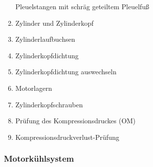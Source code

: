 \begin{enumerate}
  Pleuelstangen mit schräg geteiltem Pleuelfuß\\
\item
  Zylinder und Zylinderkopf\\
\item
  Zylinderlaufbuchsen\\
\item
  Zylinderkopfdichtung\\
\item
  Zylinderkopfdichtung auswechseln\\
\item
  Motorlagern\\
\item
  Zylinderkopfschrauben\\
\item
  Prüfung des Kompressionsdruckes (OM)\\
\item
  Kompressionsdruckverlust-Prüfung
\end{enumerate}

\subsubsection{Motorkühlsystem}\label{motorkuehlsystem}

